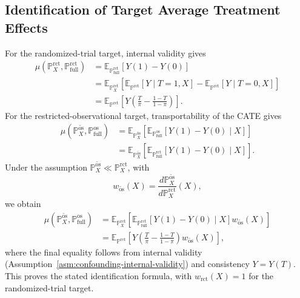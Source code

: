 \subsection{Identification of Target Average Treatment Effects}
\label{app:confounding-proof-ate}

For the randomized-trial target, internal validity gives
\[
\begin{aligned}
  \mu(\mathbb{P}^{\mathrm{rct}}_X,\mathbb{P}^{\mathrm{rct}}_{\mathrm{full}})
  &=
  \mathbb{E}_{\mathbb{P}^{\mathrm{rct}}_{\mathrm{full}}}
  [Y(1)-Y(0)] \\
  &=
  \mathbb{E}_{\mathbb{P}^{\mathrm{rct}}_X}
  \left[
    \mathbb{E}_{\mathbb{P}^{\mathrm{rct}}}[Y\mid T=1,X]
    -
    \mathbb{E}_{\mathbb{P}^{\mathrm{rct}}}[Y\mid T=0,X]
  \right] \\
  &=
  \mathbb{E}_{\mathbb{P}^{\mathrm{rct}}}
  \left[
    Y
    \left(
      \frac{T}{\pi}
      -
      \frac{1-T}{1-\pi}
    \right)
  \right].
\end{aligned}
\]
For the restricted-observational target, transportability of the CATE gives
\[
\begin{aligned}
  \mu(\mathbb{P}^{\widetilde{\mathrm{os}}}_X,\mathbb{P}^{\mathrm{os}}_{\mathrm{full}})
  &=
  \mathbb{E}_{\mathbb{P}^{\widetilde{\mathrm{os}}}_X}
  \left[
    \mathbb{E}_{\mathbb{P}^{\mathrm{os}}_{\mathrm{full}}}
    [Y(1)-Y(0)\mid X]
  \right] \\
  &=
  \mathbb{E}_{\mathbb{P}^{\widetilde{\mathrm{os}}}_X}
  \left[
    \mathbb{E}_{\mathbb{P}^{\mathrm{rct}}_{\mathrm{full}}}
    [Y(1)-Y(0)\mid X]
  \right].
\end{aligned}
\]
Under the assumption \(\mathbb{P}^{\widetilde{\mathrm{os}}}_X\ll\mathbb{P}^{\mathrm{rct}}_X\), with
\[
  w_{\widetilde{\mathrm{os}}}(X)
  =
  \frac{d\mathbb{P}^{\widetilde{\mathrm{os}}}_X}
       {d\mathbb{P}^{\mathrm{rct}}_X}(X),
\]
we obtain
\[
\begin{aligned}
  \mu(\mathbb{P}^{\widetilde{\mathrm{os}}}_X,\mathbb{P}^{\mathrm{os}}_{\mathrm{full}})
  &=
  \mathbb{E}_{\mathbb{P}^{\mathrm{rct}}_X}
  \left[
    \mathbb{E}_{\mathbb{P}^{\mathrm{rct}}_{\mathrm{full}}}
    [Y(1)-Y(0)\mid X]
    w_{\widetilde{\mathrm{os}}}(X)
  \right] \\
  &=
  \mathbb{E}_{\mathbb{P}^{\mathrm{rct}}}
  \left[
    Y
    \left(
      \frac{T}{\pi}
      -
      \frac{1-T}{1-\pi}
    \right)
    w_{\widetilde{\mathrm{os}}}(X)
  \right],
\end{aligned}
\]
where the final equality follows from internal validity (Assumption~\ref{asm:confounding-internal-validity}) and consistency \(Y=Y(T)\). This proves the stated identification formula, with \(w_{\mathrm{rct}}(X)=1\) for the randomized-trial target.

